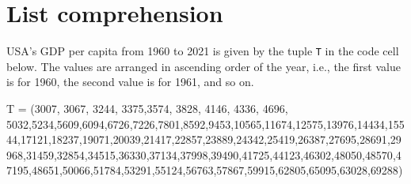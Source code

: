 \documentclass[
  letterpaper,
  DIV=11,
  numbers=noendperiod]{scrreprt}
\newenvironment{Shaded}{\begin{snugshade}}{\end{snugshade}}
\newcommand{\DecValTok}[1]{\textcolor[rgb]{0.68,0.00,0.00}{#1}}
\newcommand{\NormalTok}[1]{\textcolor[rgb]{0.00,0.23,0.31}{#1}}
\newcommand{\OperatorTok}[1]{\textcolor[rgb]{0.37,0.37,0.37}{#1}}
\begin{document}
\hypertarget{list-comprehension}{%
\section{List comprehension}\label{list-comprehension}}

USA's GDP per capita from 1960 to 2021 is given by the tuple \texttt{T}
in the code cell below. The values are arranged in ascending order of
the year, i.e., the first value is for 1960, the second value is for
1961, and so on.

\begin{Shaded}
\begin{Highlighting}[]
\NormalTok{T }\OperatorTok{=}\NormalTok{ (}\DecValTok{3007}\NormalTok{, }\DecValTok{3067}\NormalTok{, }\DecValTok{3244}\NormalTok{, }\DecValTok{3375}\NormalTok{,}\DecValTok{3574}\NormalTok{, }\DecValTok{3828}\NormalTok{, }\DecValTok{4146}\NormalTok{, }\DecValTok{4336}\NormalTok{, }\DecValTok{4696}\NormalTok{, }\DecValTok{5032}\NormalTok{,}\DecValTok{5234}\NormalTok{,}\DecValTok{5609}\NormalTok{,}\DecValTok{6094}\NormalTok{,}\DecValTok{6726}\NormalTok{,}\DecValTok{7226}\NormalTok{,}\DecValTok{7801}\NormalTok{,}\DecValTok{8592}\NormalTok{,}\DecValTok{9453}\NormalTok{,}\DecValTok{10565}\NormalTok{,}\DecValTok{11674}\NormalTok{,}\DecValTok{12575}\NormalTok{,}\DecValTok{13976}\NormalTok{,}\DecValTok{14434}\NormalTok{,}\DecValTok{15544}\NormalTok{,}\DecValTok{17121}\NormalTok{,}\DecValTok{18237}\NormalTok{,}\DecValTok{19071}\NormalTok{,}\DecValTok{20039}\NormalTok{,}\DecValTok{21417}\NormalTok{,}\DecValTok{22857}\NormalTok{,}\DecValTok{23889}\NormalTok{,}\DecValTok{24342}\NormalTok{,}\DecValTok{25419}\NormalTok{,}\DecValTok{26387}\NormalTok{,}\DecValTok{27695}\NormalTok{,}\DecValTok{28691}\NormalTok{,}\DecValTok{29968}\NormalTok{,}\DecValTok{31459}\NormalTok{,}\DecValTok{32854}\NormalTok{,}\DecValTok{34515}\NormalTok{,}\DecValTok{36330}\NormalTok{,}\DecValTok{37134}\NormalTok{,}\DecValTok{37998}\NormalTok{,}\DecValTok{39490}\NormalTok{,}\DecValTok{41725}\NormalTok{,}\DecValTok{44123}\NormalTok{,}\DecValTok{46302}\NormalTok{,}\DecValTok{48050}\NormalTok{,}\DecValTok{48570}\NormalTok{,}\DecValTok{47195}\NormalTok{,}\DecValTok{48651}\NormalTok{,}\DecValTok{50066}\NormalTok{,}\DecValTok{51784}\NormalTok{,}\DecValTok{53291}\NormalTok{,}\DecValTok{55124}\NormalTok{,}\DecValTok{56763}\NormalTok{,}\DecValTok{57867}\NormalTok{,}\DecValTok{59915}\NormalTok{,}\DecValTok{62805}\NormalTok{,}\DecValTok{65095}\NormalTok{,}\DecValTok{63028}\NormalTok{,}\DecValTok{69288}\NormalTok{)}
\end{Highlighting}
\end{Shaded}
\end{document}
